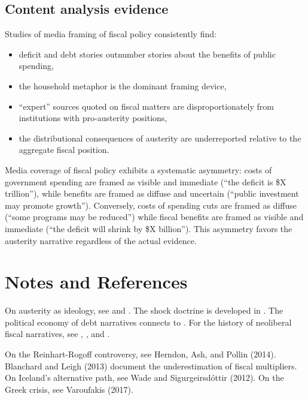 \subsection{Content analysis evidence}

Studies of media framing of fiscal policy consistently find:
\begin{itemize}[nosep]
  \item deficit and debt stories outnumber stories about the benefits of public spending,
  \item the household metaphor is the dominant framing device,
  \item ``expert'' sources quoted on fiscal matters are disproportionately from institutions with pro-austerity positions,
  \item the distributional consequences of austerity are underreported relative to the aggregate fiscal position.
\end{itemize}

\begin{proposition}
\label{prop:asymmetric-framing}
Media coverage of fiscal policy exhibits a systematic asymmetry: costs of government spending are framed as visible and immediate (``the deficit is \$X trillion''), while benefits are framed as diffuse and uncertain (``public investment may promote growth'').
Conversely, costs of spending cuts are framed as diffuse (``some programs may be reduced'') while fiscal benefits are framed as visible and immediate (``the deficit will shrink by \$X billion'').
This asymmetry favors the austerity narrative regardless of the actual evidence.
\end{proposition}

\section{Notes and References}
\label{sec:ch25-notes}

On austerity as ideology, see \textcite{streeck2016} and \textcite{brown2015}.
The shock doctrine is developed in \textcite{klein2007}.
The political economy of debt narratives connects to \textcite{graeber2011}.
For the history of neoliberal fiscal narratives, see \textcite{mirowski2009}, \textcite{harvey2005}, and \textcite{slobodian2018}.

On the Reinhart-Rogoff controversy, see Herndon, Ash, and Pollin (2014).
Blanchard and Leigh (2013) document the underestimation of fiscal multipliers.
On Iceland's alternative path, see Wade and Sigurgeirsd{\'o}ttir (2012).
On the Greek crisis, see Varoufakis (2017).

